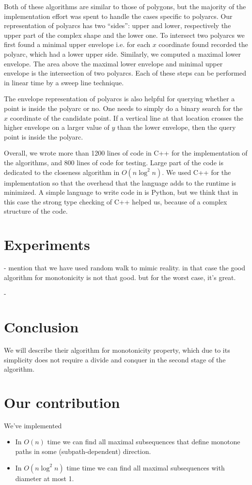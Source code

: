 \documentclass{article}
\begin{document}
Both of these algorithms are similar to those of polygons, but the majority of the implementation effort was spent to handle the cases specific to polyarcs. Our representation of polyarcs has two ``sides'': upper and lower, respectively the upper part of the complex shape and the lower one. To intersect two polyarcs we first found a minimal upper envelope i.e. for each $x$ coordinate found recorded the polyarc, which had a lower upper side. Similarly, we computed a maximal lower envelope. The area above the maximal lower envelope and minimal upper envelope is the intersection of two polyarcs. Each of these steps can be performed in linear time by a sweep line technique.

The envelope representation of polyarcs is also helpful for querying whether a point is inside the polyarc or no. One needs to simply do a binary search for the $x$ coordinate of the candidate point.
If a vertical line at that location crosses the higher envelope on a larger value of $y$ than the lower envelope, then the query point is inside the polyarc.

Overall, we wrote more than 1200 lines of code in C++ for the implementation of the algorithms, and 800 lines of code for testing. Large part of the code is dedicated to the closeness algorithm in $O(n \log^2 n)$. We used C++ for the implementation so that the overhead that the language adds to the runtime is minimized. A simple language to write code in is Python, but we think that in this case the strong type checking of C++ helped us, because of a complex structure of the code. 

\section{Experiments}
\label{sec:experiments}
- mention that we have used random walk to mimic reality. in that case the good algorithm for monotonicity is not that good. but for the worst case, it's great.

- 

\section{Conclusion}
\label{sec:conclusion}

We will describe their algorithm for monotonicity property, which due to its simplicity does not require a divide and conquer in the second stage of the algorithm.

\section{Our contribution}
We've implemented
\begin{itemize}
\item In $O(n)$ time  we  can  find  all  maximal  subsequences  that  define  monotone  paths  in  some (subpath-dependent) direction. \cite{bokal_et_al:LIPIcs:2015:5113} 
\item In $O(n \log^2 n)$ time time we can find all maximal subsequences with diameter at most 1. \cite{chan_et_al:LIPIcs:2016:5920}
\end{itemize}
\end{document}
